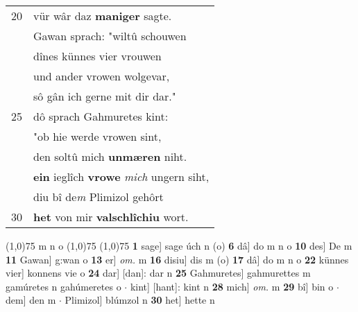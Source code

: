 \documentclass[8pt,a4paper,notitlepage]{article}
\begin{document}
\begin{table}[ht]
\begin{minipage}[t]{0.5\linewidth}
\begin{tabular}{rl}
20 & vür wâr daz \textbf{maniger} sagte.\\ 
 & Gawan sprach: "wiltû schouwen\\ 
 & dînes künnes vier vrouwen\\ 
 & und ander vrowen wolgevar,\\ 
 & sô gân ich gerne mit dir dar."\\ 
25 & dô sprach Gahmuretes kint:\\ 
 & "ob hie werde vrowen sint,\\ 
 & den soltû mich \textbf{unmæren} niht.\\ 
 & \textbf{ein} ieglîch \textbf{vrowe} \textit{mich} ungern siht,\\ 
 & diu bî de\textit{m} Plimizol gehôrt\\ 
30 & \textbf{het} von mir \textbf{valschlîchiu} wort.\\ 
\end{tabular}
\scriptsize
\line(1,0){75} \newline
m n o \newline
\line(1,0){75} \newline
\newline
\line(1,0){75} \newline
\textbf{1} sage] sage úch n (o) \textbf{6} dâ] do m n o \textbf{10} des] De m \textbf{11} Gawan] g:wan o \textbf{13} er] \textit{om.} m \textbf{16} disiu] dis m (o) \textbf{17} dâ] do m n o \textbf{22} künnes vier] konnens vie o \textbf{24} dar] [dan]: dar n \textbf{25} Gahmuretes] gahmurettes m gamúretes n gahúmeretes o  $\cdot$ kint] [hant]: kint n \textbf{28} mich] \textit{om.} m \textbf{29} bî] bin o  $\cdot$ dem] den m  $\cdot$ Plimizol] blúmzol n \textbf{30} het] hette n \newline
\end{minipage}
\end{table}
\newpage
\end{document}
